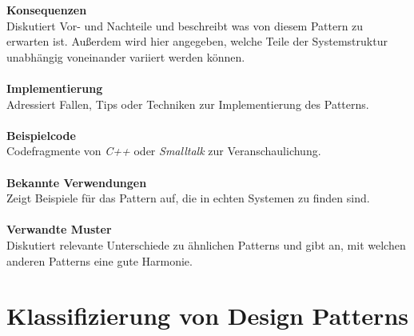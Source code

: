 \documentclass[fontsize=11pt,a4paper,final]{scrreprt}[2003/01/01]
\begin{document}
\textbf{Konsequenzen} \\
Diskutiert Vor- und Nachteile und beschreibt was von diesem Pattern zu erwarten ist. Außerdem wird hier angegeben, welche Teile der Systemstruktur unabhängig voneinander variiert werden können. \\ \\
\textbf{Implementierung} \\
Adressiert Fallen, Tips oder Techniken zur Implementierung des Patterns. \\ \\
\textbf{Beispielcode} \\
Codefragmente von \textit{C++} oder \textit{Smalltalk} zur Veranschaulichung. \\ \\
\textbf{Bekannte Verwendungen} \\
Zeigt Beispiele für das Pattern auf, die in echten Systemen zu finden sind. \\ \\
\textbf{Verwandte Muster} \\
Diskutiert relevante Unterschiede zu ähnlichen Patterns und gibt an, mit welchen anderen Patterns eine gute Harmonie.
\section{Klassifizierung von Design Patterns}\label{se:Klassifizierung}
\end{document}
